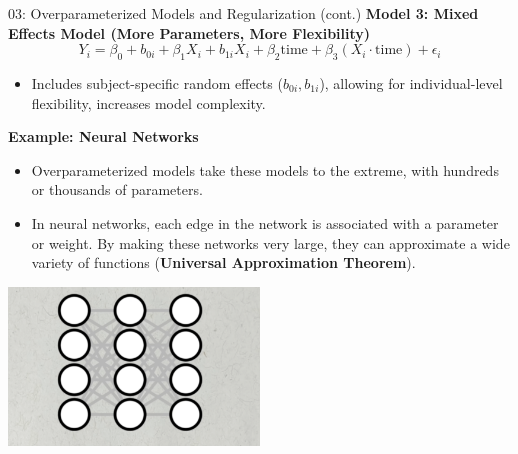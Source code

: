 \documentclass{beamer}
\begin{document}
\begin{frame}{03: Overparameterized Models and Regularization (cont.)}
\scriptsize
\textbf{Model 3: Mixed Effects Model (More Parameters, More Flexibility)}
\[
Y_i = \beta_0 + b_{0i} + \beta_1 X_i + b_{1i} X_i + \beta_2 \text{time} + \beta_3 (X_i \cdot \text{time}) + \epsilon_i
\]
\vspace{-1em}
\begin{itemize}
    \item Includes subject-specific random effects (\(b_{0i}, b_{1i}\)), allowing for individual-level flexibility, increases model complexity.
\end{itemize}


\textbf{Example: Neural Networks}
\begin{itemize}
    \item Overparameterized models take these models to the extreme, with hundreds or thousands of parameters.
    \item In neural networks, each edge in the network is associated with a parameter or weight. By making these networks very large, they can approximate a wide variety of functions (\textbf{Universal Approximation Theorem}).
\end{itemize}

\begin{center}
    \includegraphics[width=0.5\textwidth]{neural_network.png}
\end{center}

\end{frame}
\end{document}
